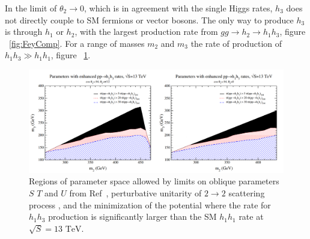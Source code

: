 \indent In the limit of ${\theta_{2}\rightarrow{0}}$, which is in agreement with the single Higgs rates, ${h_{3}}$ does not directly couple to SM fermions or vector bosons. The only way to produce ${h_{3}}$ is through ${h_{1}}$ or ${h_{2}}$, with the largest production rate from ${gg\rightarrow h_{2}\rightarrow h_{1}h_{3}}$, figure ~\ref{fig:FeyComp}. For a range of masses ${m_{2}}$ and ${m_{3}}$ the rate of production of ${h_{1}h_{3} \gg h_{1}h_{1}}$, figure ~\ref{fig:CSH6}. \newline

\begin{figure}[h]
\begin{center}
\includegraphics[scale=0.4]{figures/CompHiggsSing_Fig6_2}
\caption[Allowed regions of parameter space with enhanced di-Higgs production]{Regions of parameter space allowed by limits on oblique parameters $S$ $T$ and $U$ from Ref~\cite{deBlas2016}, perturbative unitarity of $2\rightarrow2$ scattering process \cite{PhysRevD.16.1519}, and the minimization of the potential where the rate for ${h_{1}h_{3}}$ production is significantly larger than the SM ${h_{1}h_{1}}$ rate at ${\sqrt{S} = 13 \text{ TeV}}$.}
\label{fig:CSH6}
\end{center}
\end{figure}


